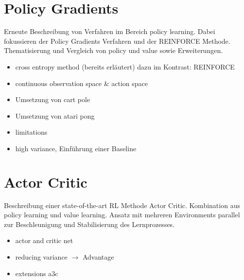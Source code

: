 \documentclass[11pt]{scrartcl}
\begin{document}
\section{Policy Gradients}
Erneute Beschreibung von Verfahren im Bereich policy learning. Dabei fokussieren der
Policy Gradients Verfahren und der REINFORCE Methode. Thematisierung und Vergleich von
policy und value sowie Erweiterungen.
\begin{itemize}
\itemsep0pt
\item cross entropy method (bereits erläutert) dazu im Kontrast: REINFORCE
\item continuous observation space \& action space
\item Umsetzung von cart pole
\item Umsetzung von atari pong
\item limitations
\item high variance, Einführung einer Baseline
\end{itemize}

\section{Actor Critic}
Beschreibung einer state-of-the-art RL Methode Actor Critic. Kombination aus policy learning und value learning. Ansatz mit mehreren Environments parallel zur Beschleunigung und Stabilisierung des Lernprozesses.
\begin{itemize}
\itemsep0pt
\item actor and critic net
\item reducing variance $\rightarrow$ Advantage
\item extensions a3c
\end{itemize}
\end{document}
